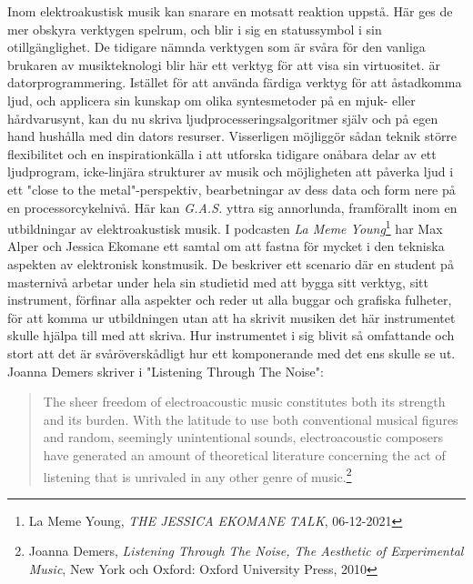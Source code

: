 \documentclass{article}
\begin{document}


Inom elektroakustisk musik kan snarare en motsatt reaktion uppstå. Här ges de mer obskyra verktygen spelrum,
och blir i sig en statussymbol i sin otillgänglighet. De tidigare nämnda verktygen som är svåra för den
vanliga brukaren av musikteknologi blir här ett verktyg för att visa sin virtuositet. 
är datorprogrammering. 
Istället för att använda färdiga verktyg för att åstadkomma ljud, och applicera sin kunskap om olika
syntesmetoder på en mjuk- eller hårdvarusynt, kan du nu skriva ljudprocesseringsalgoritmer själv och på egen
hand hushålla med din dators resurser. Visserligen möjliggör sådan teknik större flexibilitet och en
inspirationkälla i att utforska tidigare onåbara delar av ett ljudprogram, icke-linjära strukturer av musik
och möjligheten att påverka ljud i ett "close to the metal"-perspektiv, bearbetningar av dess data och form
nere på en processorcykelnivå. Här kan \emph{G.A.S.} yttra sig annorlunda, framförallt inom en utbildningar av
elektroakustisk musik. I podcasten \emph{La Meme Young}\footnote{La Meme Young, \emph{THE JESSICA EKOMANE
TALK}, 06-12-2021} har Max Alper och Jessica Ekomane ett samtal om att
fastna för mycket i den tekniska aspekten av elektronisk konstmusik. De beskriver ett scenario där en student
på masternivå arbetar under hela sin studietid med att bygga sitt verktyg, sitt instrument, förfinar alla
aspekter och reder
ut alla buggar och grafiska fulheter, för att komma ur utbildningen utan att ha skrivit
musiken det här instrumentet skulle hjälpa till med att skriva. Hur instrumentet i sig blivit så omfattande
och stort att det är svåröverskådligt hur ett komponerande med det ens skulle se ut. 
Joanna Demers skriver i "Listening Through The Noise":


\begin{quote}
The sheer freedom of electroacoustic music constitutes both its strength and its burden. With the
latitude to use both conventional musical figures and random, seemingly unintentional sounds,
electroacoustic composers have generated an amount of theoretical literature concerning the act of
listening that is unrivaled in any other genre of music.\footnote{Joanna Demers, \emph{Listening Through The
	Noise, The Aesthetic of Experimental Music}, New York och Oxford: Oxford University Press, 2010}
\end{quote}
\end{document}
